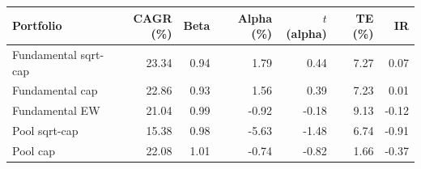 \begin{tabular}{lrrrrrr}
\toprule
Portfolio & CAGR (\%) & Beta & Alpha (\%) & $t$(alpha) & TE (\%) & IR \\
\midrule
Fundamental sqrt-cap & 23.34 & 0.94 & 1.79 & 0.44 & 7.27 & 0.07 \\
Fundamental cap & 22.86 & 0.93 & 1.56 & 0.39 & 7.23 & 0.01 \\
Fundamental EW & 21.04 & 0.99 & -0.92 & -0.18 & 9.13 & -0.12 \\
Pool sqrt-cap & 15.38 & 0.98 & -5.63 & -1.48 & 6.74 & -0.91 \\
Pool cap & 22.08 & 1.01 & -0.74 & -0.82 & 1.66 & -0.37 \\
\bottomrule
\end{tabular}
